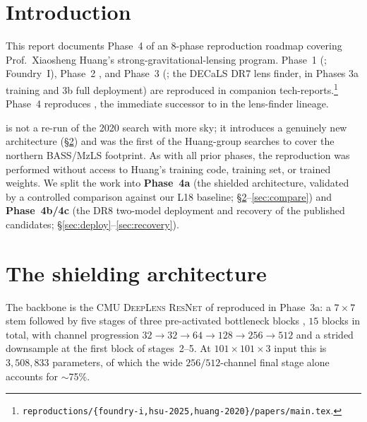 \documentclass[11pt,letterpaper]{article}
\newcommand{\ResNet}{\textsc{ResNet}}
\newcommand{\Lanusse}{\textsc{CMU DeepLens}}
\begin{document}
\tableofcontents
\bigskip

\section{Introduction}

This report documents Phase~4 of an 8-phase reproduction roadmap covering
Prof.\ Xiaosheng Huang's strong-gravitational-lensing program. Phase~1
(\textcite{huang2025foundry1}; Foundry~I), Phase~2 \autocite{hsu2025pairwise},
and Phase~3 (\textcite{huang2020decals}; the DECaLS DR7 lens finder, in Phases
3a training and 3b full deployment) are reproduced in companion
tech-reports.\footnote{\texttt{reproductions/\{foundry-i,hsu-2025,huang-2020\}/papers/main.tex}.}
Phase~4 reproduces \textcite{huang2021desi}, the immediate successor to
\textcite{huang2020decals} in the lens-finder lineage.

\textcite{huang2021desi} is not a re-run of the 2020 search with more sky; it
introduces a genuinely new architecture (\S\ref{sec:shield}) and was the first
of the Huang-group searches to cover the northern BASS/MzLS footprint. As with
all prior phases, the reproduction was performed without access to Huang's
training code, training set, or trained weights. We split the work into
\textbf{Phase~4a} (the shielded architecture, validated by a controlled
comparison against our L18 baseline; \S\ref{sec:shield}--\ref{sec:compare}) and
\textbf{Phase~4b/4c} (the DR8 two-model deployment and recovery of the published
candidates; \S\ref{sec:deploy}--\ref{sec:recovery}).

\section{The shielding architecture}
\label{sec:shield}

The backbone is the \Lanusse{} \ResNet{} of \textcite{lanusse2018cmu} reproduced
in Phase~3a: a $7{\times}7$ stem followed by five stages of three pre-activated
bottleneck blocks \autocite{he2016preact}, $15$ blocks in total, with channel
progression $32\to32\to64\to128\to256\to512$ and a strided downsample at the
first block of stages~2--5. At $101{\times}101{\times}3$ input this is
$3{,}508{,}833$ parameters, of which the wide $256/512$-channel final stage
alone accounts for $\sim$75\%.
\end{document}
